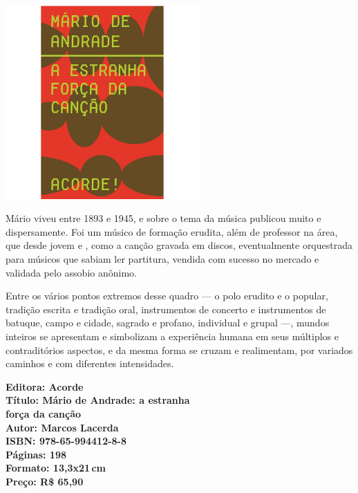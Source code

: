 \begin{center}
\hspace*{-3.6cm}
\hspace*{3.1cm}\includegraphics[width=74mm]{./CAPAS/ACORDE_MARIO.jpg}
\end{center}
\hspace*{-7cm}\hrulefill\hspace*{-7cm}
\medskip

\noindent{}Mário viveu entre 1893 e 1945, e sobre o tema da música publicou muito e dispersamente. Foi um músico de formação erudita, além de professor na área, que desde jovem e , como a canção gravada em discos, eventualmente orquestrada para músicos que sabiam ler partitura, vendida com sucesso no mercado e validada pelo assobio anônimo. 

Entre os vários pontos extremos desse quadro --- o polo erudito e o popular, tradição escrita e tradição oral, instrumentos de concerto e instrumentos de batuque, campo e cidade, sagrado e profano, individual e grupal ---, mundos inteiros se apresentam e simbolizam a experiência humana em seus múltiplos e contraditórios aspectos, e da mesma forma se cruzam e realimentam, por variados caminhos e com diferentes intensidades.

\vfill
\hspace*{-.4cm}\begin{minipage}[c]{.5\linewidth}
\small\textbf{
\hspace*{-.1cm}Editora: Acorde\\
Título: Mário de Andrade: a estranha\\força da canção\\
Autor: Marcos Lacerda\\ 
ISBN: 978-65-994412-8-8\\
Páginas: 198\\
Formato: 13,3x21\,cm\\
Preço: R\$ 65,90\\
}
\end{minipage}

